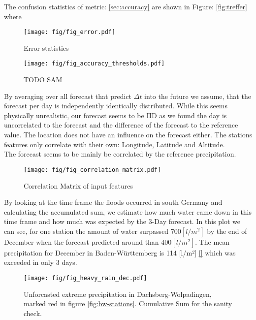 \documentclass{article}
\theoremstyle{plain}
\theoremstyle{definition}
\theoremstyle{remark}
\begin{document}
The confusion statistics of metric: \ref{sec:accuracy} are shown in Figure:
\ref{fig:treffer} where
\begin{figure}[h]
    \centering
    \label{fig:error}
    \texttt{[image: fig/fig\_error.pdf]}
    \caption{Error statistics}
\end{figure}

\begin{figure}[h]
    \centering
    \label{fig:accuracy}
    \texttt{[image: fig/fig\_accuracy\_thresholds.pdf]}
    \caption{TODO SAM}
\end{figure}

By averaging over all forecast that predict $\Delta t$ into the future we
assume, that the forecast per day is independently identically distributed.
While this seems physically unrealistic, our forecast seems to be IID as we
found the day is uncorrelated to the forecast and the difference of the
forecast to the reference value. The location does not have an influence on the
forecast either. The stations features only correlate with their own:
Longitude, Latitude and Altitude. \\
The forecast seems to be mainly be correlated by the reference precipitation.
\begin{figure}[h]
    \centering
    \label{fig:corr_matrix}
    \texttt{[image: fig/fig\_correlation\_matrix.pdf]}
    \caption{Correlation Matrix of input features}
\end{figure}

By looking at the time frame the floods occurred in south Germany and
calculating the accumulated sum, we estimate how much water came down in this
time frame and how much was expected by the 3-Day forecast. In this plot we can
see, for one station the amount of water surpassed $700 [l/m^2]$ by the end of
December when the forecast predicted around than $400 [l/m^2]$. The mean
precipitation for December in Baden-Württemberg is 114 [l/m²] \ref{} which was
exceeded in only 3 days.

\begin{figure}[h]
    \centering
    \label{fig:cum_sum_heavy_rain}
    \texttt{[image: fig/fig\_heavy\_rain\_dec.pdf]}
    \caption{Unforcasted extreme precipitation in Dachsberg-Wolpadingen, marked red
        in figure \ref{fig:bw-stations}. Cumulative Sum for the sanity check. }
\end{figure}
\end{document}
